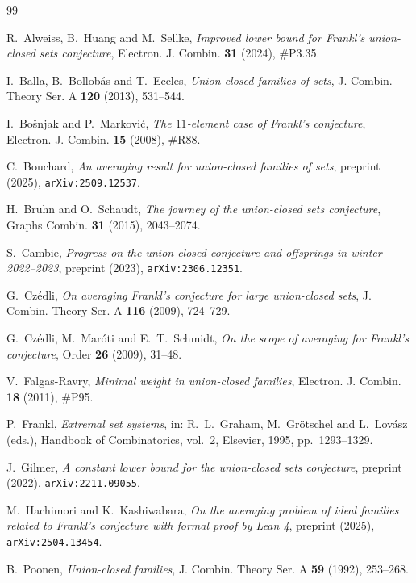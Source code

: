 \documentclass[11pt,a4paper]{amsart}
\theoremstyle{plain}
\theoremstyle{definition}
\begin{document}
\begin{thebibliography}{99}

 R.~Alweiss, B.~Huang and M.~Sellke,
\emph{Improved lower bound for Frankl's union-closed sets conjecture},
Electron. J. Combin. \textbf{31} (2024), \#P3.35.

 I.~Balla, B.~Bollob\'as and T.~Eccles,
\emph{Union-closed families of sets},
J. Combin. Theory Ser. A \textbf{120} (2013), 531--544.

 I.~Bo\v{s}njak and P.~Markovi\'c,
\emph{The $11$-element case of Frankl's conjecture},
Electron. J. Combin. \textbf{15} (2008), \#R88.

 C.~Bouchard,
\emph{An averaging result for union-closed families of sets},
preprint (2025), \texttt{arXiv:2509.12537}.

 H.~Bruhn and O.~Schaudt,
\emph{The journey of the union-closed sets conjecture},
Graphs Combin. \textbf{31} (2015), 2043--2074.

 S.~Cambie,
\emph{Progress on the union-closed conjecture and offsprings in winter
2022--2023}, preprint (2023), \texttt{arXiv:2306.12351}.

 G.~Cz\'edli,
\emph{On averaging Frankl's conjecture for large union-closed sets},
J. Combin. Theory Ser. A \textbf{116} (2009), 724--729.

 G.~Cz\'edli, M.~Mar\'oti and E.~T.~Schmidt,
\emph{On the scope of averaging for Frankl's conjecture},
Order \textbf{26} (2009), 31--48.

 V.~Falgas-Ravry,
\emph{Minimal weight in union-closed families},
Electron. J. Combin. \textbf{18} (2011), \#P95.

 P.~Frankl,
\emph{Extremal set systems}, in: R.~L.~Graham, M.~Gr\"otschel and L.~Lov\'asz
(eds.), Handbook of Combinatorics, vol.~2, Elsevier, 1995, pp.~1293--1329.

 J.~Gilmer,
\emph{A constant lower bound for the union-closed sets conjecture},
preprint (2022), \texttt{arXiv:2211.09055}.

 M.~Hachimori and K.~Kashiwabara,
\emph{On the averaging problem of ideal families related to Frankl's conjecture
with formal proof by Lean 4}, preprint (2025), \texttt{arXiv:2504.13454}.

 B.~Poonen,
\emph{Union-closed families},
J. Combin. Theory Ser. A \textbf{59} (1992), 253--268.


\end{thebibliography}
\end{document}
